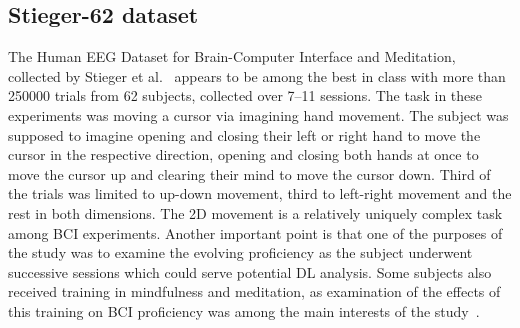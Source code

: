 \documentclass[english, he, bc, kiv, iso690alph]{fasthesis}
\begin{document}
\begin{table}
\centering
{}
\caption{Comparison of recent datasets.}
\label{tab:datasets}
\end{table}


\subsection{Stieger-62 dataset}

The Human EEG Dataset for Brain-Computer Interface and Meditation, collected by Stieger et al.~\cite{data:stieger:21} appears to be among the best in class with more than 250000 trials from 62 subjects, collected over 7--11 sessions.
The task in these experiments was moving a cursor via imagining hand movement. The subject was supposed to imagine opening and closing their left or right hand to move the cursor in the respective direction, opening and closing both hands at once to move the cursor up and clearing their mind to move the cursor down. Third of the trials was limited to up-down movement, third to left-right movement and the rest in both dimensions.
The 2D movement is a relatively uniquely complex task among BCI experiments.
Another important point is that one of the purposes of the study was to examine the evolving proficiency as the subject underwent successive sessions which could serve potential DL analysis.
Some subjects also received training in mindfulness and meditation, as examination of the effects of this training on BCI proficiency was among the main interests of the study~\cite{stieger:mindfulness:20}.
\end{document}
